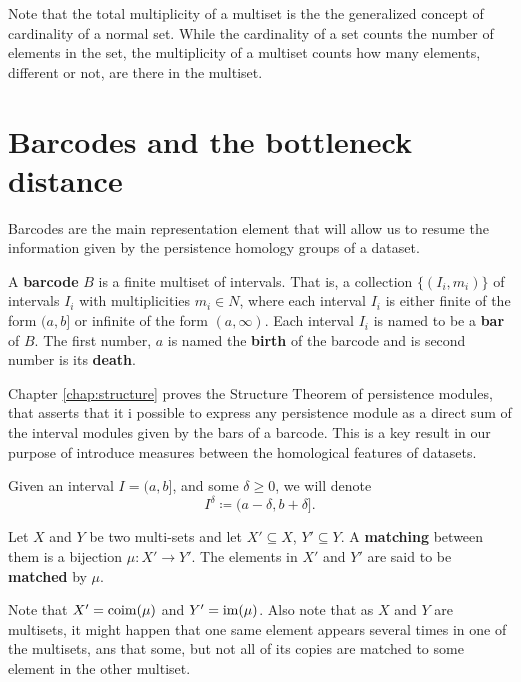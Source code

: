 Note that the total multiplicity of a multiset is the the generalized concept of cardinality of a normal set. While the cardinality of a set counts the number of elements in the set, the multiplicity of a multiset counts how many elements, different or not, are there in the multiset.

\section{Barcodes and the bottleneck distance} \label{sec:preliminaries-barcodes}
Barcodes are the main representation element that will allow us to resume the information given by the persistence homology groups of a dataset.

\begin{definition}[Barcode]
    A {\bf barcode} $B$ is a finite multiset of intervals. That is, a collection $\{(I_i, m_i)\}$ of intervals $I_i$ with multiplicities $m_i \in N$, where each interval $ I_i $ is either finite of the form $(a, b]$ or infinite of the form $(a, \infty)$. Each interval $I_i$ is named to be a {\bf bar} of $B$. The first number, $ a $ is named the {\bf birth} of the barcode and is second number is its {\bf death}.
\end{definition}

Chapter \ref{chap:structure} proves the Structure Theorem of persistence modules, that asserts that it i possible to express any persistence module as a direct sum of the interval modules given by the bars of a barcode. This is a key result in our purpose of introduce measures between the homological features of datasets. 

Given an interval $ I = (a, b]$, and some $ \delta \geq 0 $, we will denote
\begin{equation}
    I^\delta \coloneq (a-\delta, b+\delta].
\end{equation}

\begin{definition}
    Let $ X $ and $ Y $ be two multi-sets and let $ X' \subseteq X $, $ Y' \subseteq Y$. A {\bf matching} between them is a bijection $ \mu \colon X' \to Y' $. The elements in $ X' $ and $ Y' $ are said to be {\bf matched} by $ \mu $.
\end{definition}

Note that $ X' = \operatorname{coim}(\mu) $ and $ Y' = \operatorname{im}(\mu) $. Also note that as $ X $ and $ Y $ are multisets, it might happen that one same element appears several times in one of the multisets, ans that some, but not all of its copies are matched to some element in the other multiset. 

